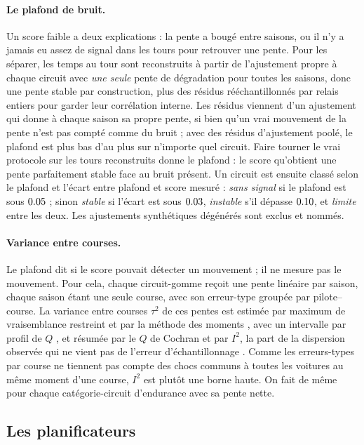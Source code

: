 \documentclass[11pt,a4paper]{article}
\begin{document}
\paragraph{Le plafond de bruit.} Un score faible a deux explications : la pente
a bougé entre saisons, ou il n'y a jamais eu assez de signal dans les tours pour
retrouver une pente. Pour les séparer, les temps au tour sont reconstruits à
partir de l'ajustement propre à chaque circuit avec \emph{une seule} pente de
dégradation pour toutes les saisons, donc une pente stable par construction, plus
des résidus rééchantillonnés par relais entiers pour garder leur corrélation
interne. Les résidus viennent d'un ajustement qui donne à chaque saison sa
propre pente, si bien qu'un vrai mouvement de la pente n'est pas compté comme du
bruit ; avec des résidus d'ajustement poolé, le plafond est plus bas d'au plus
\CeilingResidGapMax{} sur n'importe quel circuit. Faire tourner le vrai protocole
sur les tours reconstruits donne le plafond : le score qu'obtient une pente
parfaitement stable face au bruit présent. Un circuit est ensuite classé selon
le plafond et l'écart entre plafond et score mesuré : \emph{sans signal} si le
plafond est sous $0.05{}$ ; sinon \emph{stable} si l'écart est sous
$0.03{}$, \emph{instable} s'il dépasse $0.10{}$, et \emph{limite}
entre les deux. Les ajustements synthétiques dégénérés sont exclus et nommés.

\paragraph{Variance entre courses.} Le plafond dit si le score pouvait détecter
un mouvement ; il ne mesure pas le mouvement. Pour cela, chaque circuit-gomme
reçoit une pente linéaire par saison, chaque saison étant une seule course, avec
son erreur-type groupée par pilote--course. La variance entre courses $\tau^2$
de ces pentes est estimée par maximum de vraisemblance restreint et par la
méthode des moments \citep{dersimonian1986},
avec un intervalle par profil de $Q$ \citep{viechtbauer2007}, et résumée par le
$Q$ de Cochran et par $I^2$, la part de la dispersion observée qui ne vient pas
de l'erreur d'échantillonnage \citep{higgins2002}. Comme les erreurs-types par
course ne tiennent pas compte des chocs communs à toutes les voitures au même
moment d'une course, $I^2$ est plutôt une borne haute. On fait de même pour
chaque catégorie-circuit d'endurance avec sa pente nette.

\subsection{Les planificateurs}
\label{sec:method}
\end{document}
